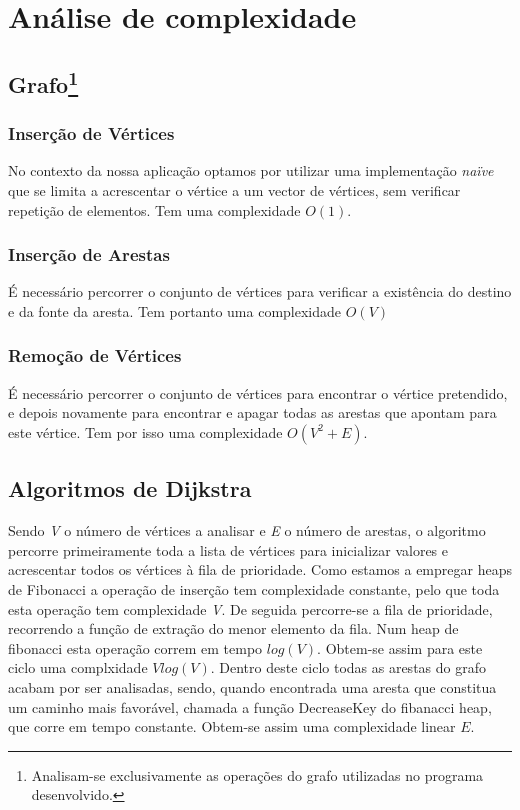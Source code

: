 \documentclass[a4paper,12pt,titlepage]{article}
\begin{document}
\section{Análise de complexidade}
\subsection[Grafo]{Grafo\footnote{Analisam-se exclusivamente as operações do grafo utilizadas no programa desenvolvido.}}

\subsubsection{Inserção de Vértices}
No contexto da nossa aplicação optamos por utilizar uma implementação \emph{naïve} que se limita a acrescentar o vértice a um vector de vértices, sem verificar repetição de elementos. Tem uma complexidade $O(1)$.

\subsubsection{Inserção de Arestas}
É necessário percorrer o conjunto de vértices para verificar a existência do destino e da fonte da aresta. Tem portanto uma complexidade $O(V)$

\subsubsection{Remoção de Vértices}
É necessário percorrer o conjunto de vértices para encontrar o vértice pretendido, e depois novamente para encontrar e apagar todas as arestas que apontam para este vértice. Tem por isso uma complexidade $O(V^2+E)$.


\subsection{Algoritmos de Dijkstra}
Sendo \emph{V} o número de vértices a analisar e \emph{E} o número de arestas, o algoritmo percorre primeiramente toda a lista de vértices para inicializar valores e acrescentar todos os vértices à fila de prioridade. Como estamos a empregar heaps de Fibonacci a operação de inserção tem complexidade constante, pelo que toda esta operação tem complexidade \emph{V}. De seguida percorre-se a fila de prioridade, recorrendo a função de extração do menor elemento da fila. Num heap de fibonacci esta operação correm em tempo $log(V)$. Obtem-se assim para este ciclo uma complxidade $Vlog(V)$. Dentro deste ciclo todas as arestas do grafo acabam por ser analisadas, sendo, quando encontrada uma aresta que constitua um caminho mais favorável, chamada a função DecreaseKey do fibanacci heap, que corre em tempo constante. Obtem-se assim uma complexidade linear $E$.
\end{document}
